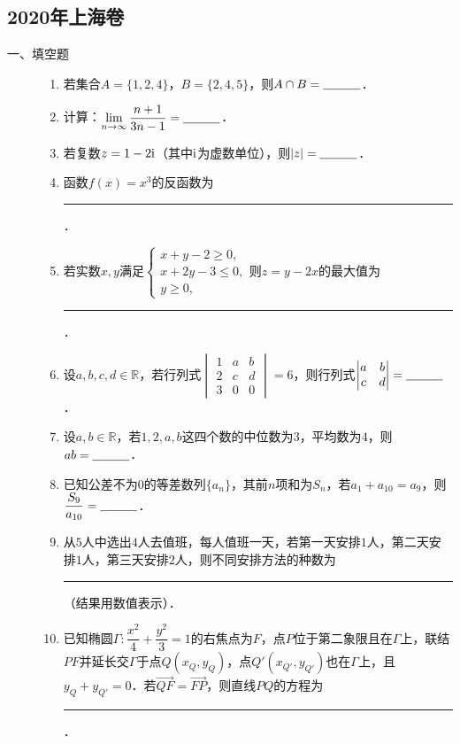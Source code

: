 \subsection{2020年上海卷}\label{gk:2020年上海卷}

\begin{description}
    \item[一、填空题]
    \begin{enumerate}[leftmargin=5pt]
        \item 若集合$A=\{1,2,4\}$，$B=\{2,4,5\}$，则$A\cap B=\rule[-0.3ex]{3em}{0.4pt}$．
        \item 计算：$\lim\limits_{n\to\infty}\dfrac{n+1}{3n-1}=\rule[-0.3ex]{3em}{0.4pt}$．
        \item 若复数$z=1-2\mathrm{i}$（其中$\mathrm{i}$为虚数单位），则$|z|=\rule[-0.3ex]{3em}{0.4pt}$．
        \item 函数$f(x)=x^{3}$的反函数为\rule[-0.3ex]{6em}{0.4pt}．
        \item 若实数$x,y$满足$\begin{cases}x+y-2\geqslant 0,\\ x+2y-3\leqslant 0,\\ y\geqslant 0,\end{cases}$则$z=y-2x$的最大值为\rule[-0.3ex]{3em}{0.4pt}．
        \item 设$a,b,c,d\in\mathbb{R}$，若行列式$\begin{vmatrix}1&a&b\\2&c&d\\3&0&0\end{vmatrix}=6$，则行列式$\begin{vmatrix}a&b\\c&d\end{vmatrix}=\rule[-0.3ex]{3em}{0.4pt}$．
        \item 设$a,b\in\mathbb{R}$，若$1,2,a,b$这四个数的中位数为$3$，平均数为$4$，则$ab=\rule[-0.3ex]{3em}{0.4pt}$．
        \item 已知公差不为$0$的等差数列$\{a_{n}\}$，其前$n$项和为$S_{n}$，若$a_{1}+a_{10}=a_{9}$，则$\dfrac{S_{9}}{a_{10}}=\rule[-0.3ex]{3em}{0.4pt}$．
        \item 从$5$人中选出$4$人去值班，每人值班一天，若第一天安排$1$人，第二天安排$1$人，第三天安排$2$人，则不同安排方法的种数为\rule[-0.3ex]{3em}{0.4pt}（结果用数值表示）．
        \item 已知椭圆$\Gamma:\dfrac{x^{2}}{4}+\dfrac{y^{2}}{3}=1$的右焦点为$F$，点$P$位于第二象限且在$\Gamma$上，联结$PF$并延长交$\Gamma$于点$Q(x_{Q},y_{Q})$，点$Q'(x_{Q'},y_{Q'})$也在$\Gamma$上，且$y_{Q}+y_{Q'}=0$．若$\overrightarrow{QF}=\overrightarrow{FP}$，则直线$PQ$的方程为\rule[-0.3ex]{10em}{0.4pt}．

\end{enumerate}
\end{description}
